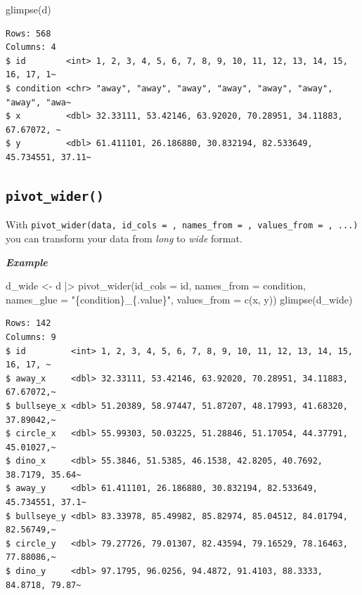 \documentclass[
  letterpaper,
  DIV=11,
  numbers=noendperiod]{scrreprt}
\newenvironment{Shaded}{\begin{snugshade}}{\end{snugshade}}
\newcommand{\AttributeTok}[1]{\textcolor[rgb]{0.40,0.45,0.13}{#1}}
\newcommand{\FunctionTok}[1]{\textcolor[rgb]{0.28,0.35,0.67}{#1}}
\newcommand{\NormalTok}[1]{\textcolor[rgb]{0.00,0.23,0.31}{#1}}
\newcommand{\OtherTok}[1]{\textcolor[rgb]{0.00,0.23,0.31}{#1}}
\newcommand{\SpecialCharTok}[1]{\textcolor[rgb]{0.37,0.37,0.37}{#1}}
\newcommand{\StringTok}[1]{\textcolor[rgb]{0.13,0.47,0.30}{#1}}
\begin{document}
\begin{Shaded}
\begin{Highlighting}[]
\FunctionTok{glimpse}\NormalTok{(d)}
\end{Highlighting}
\end{Shaded}

\begin{verbatim}
Rows: 568
Columns: 4
$ id        <int> 1, 2, 3, 4, 5, 6, 7, 8, 9, 10, 11, 12, 13, 14, 15, 16, 17, 1~
$ condition <chr> "away", "away", "away", "away", "away", "away", "away", "awa~
$ x         <dbl> 32.33111, 53.42146, 63.92020, 70.28951, 34.11883, 67.67072, ~
$ y         <dbl> 61.411101, 26.186880, 30.832194, 82.533649, 45.734551, 37.11~
\end{verbatim}

\hypertarget{pivot_wider}{%
\subsection{\texorpdfstring{\texttt{pivot\_wider()}}{pivot\_wider()}}\label{pivot_wider}}

With
\texttt{pivot\_wider(data,\ id\_cols\ =\ ,\ names\_from\ =\ ,\ values\_from\ =\ ,\ ...)}
you can transform your data from \emph{long} to \emph{wide} format.

\textbf{\emph{Example}}

\begin{Shaded}
\begin{Highlighting}[]
\NormalTok{d\_wide }\OtherTok{\textless{}{-}}\NormalTok{ d }\SpecialCharTok{|\textgreater{}} \FunctionTok{pivot\_wider}\NormalTok{(}\AttributeTok{id\_cols =}\NormalTok{ id, }\AttributeTok{names\_from =}\NormalTok{ condition, }\AttributeTok{names\_glue =} \StringTok{"\{condition\}\_\{.value\}"}\NormalTok{, }\AttributeTok{values\_from =} \FunctionTok{c}\NormalTok{(x, y))}
\FunctionTok{glimpse}\NormalTok{(d\_wide)}
\end{Highlighting}
\end{Shaded}

\begin{verbatim}
Rows: 142
Columns: 9
$ id         <int> 1, 2, 3, 4, 5, 6, 7, 8, 9, 10, 11, 12, 13, 14, 15, 16, 17, ~
$ away_x     <dbl> 32.33111, 53.42146, 63.92020, 70.28951, 34.11883, 67.67072,~
$ bullseye_x <dbl> 51.20389, 58.97447, 51.87207, 48.17993, 41.68320, 37.89042,~
$ circle_x   <dbl> 55.99303, 50.03225, 51.28846, 51.17054, 44.37791, 45.01027,~
$ dino_x     <dbl> 55.3846, 51.5385, 46.1538, 42.8205, 40.7692, 38.7179, 35.64~
$ away_y     <dbl> 61.411101, 26.186880, 30.832194, 82.533649, 45.734551, 37.1~
$ bullseye_y <dbl> 83.33978, 85.49982, 85.82974, 85.04512, 84.01794, 82.56749,~
$ circle_y   <dbl> 79.27726, 79.01307, 82.43594, 79.16529, 78.16463, 77.88086,~
$ dino_y     <dbl> 97.1795, 96.0256, 94.4872, 91.4103, 88.3333, 84.8718, 79.87~
\end{verbatim}
\end{document}
